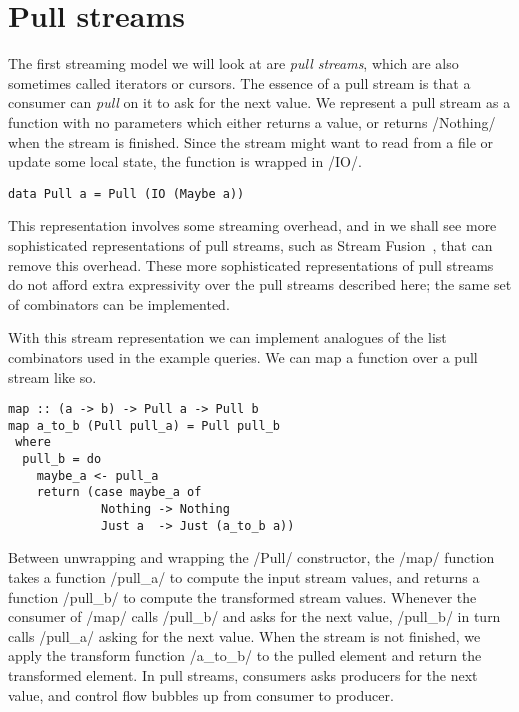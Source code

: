 \section{Pull streams}
\label{taxonomy/pull}

The first streaming model we will look at are \emph{pull streams}, which are also sometimes called iterators or cursors.
The essence of a pull stream is that a consumer can \emph{pull} on it to ask for the next value.
We represent a pull stream as a function with no parameters which either returns a value, or returns \Hs/Nothing/ when the stream is finished.
Since the stream might want to read from a file or update some local state, the function is wrapped in \Hs/IO/.

\begin{lstlisting}
data Pull a = Pull (IO (Maybe a))
\end{lstlisting}

This representation involves some streaming overhead, and in  we shall see more sophisticated representations of pull streams, such as Stream Fusion~\cite{coutts2007stream}, that can remove this overhead.
These more sophisticated representations of pull streams do not afford extra expressivity over the pull streams described here; the same set of combinators can be implemented.

With this stream representation we can implement analogues of the list combinators used in the example queries.
We can map a function over a pull stream like so.

\begin{lstlisting}
map :: (a -> b) -> Pull a -> Pull b
map a_to_b (Pull pull_a) = Pull pull_b
 where
  pull_b = do
    maybe_a <- pull_a
    return (case maybe_a of
             Nothing -> Nothing
             Just a  -> Just (a_to_b a))
\end{lstlisting}

Between unwrapping and wrapping the \Hs/Pull/ constructor, the \Hs/map/ function takes a function \Hs/pull_a/ to compute the input stream values, and returns a function \Hs/pull_b/ to compute the transformed stream values.
Whenever the consumer of \Hs/map/ calls \Hs/pull_b/ and asks for the next value, \Hs/pull_b/ in turn calls \Hs/pull_a/ asking for the next value.
When the stream is not finished, we apply the transform function \Hs/a_to_b/ to the pulled element and return the transformed element.
In pull streams, consumers asks producers for the next value, and control flow bubbles up from consumer to producer.

